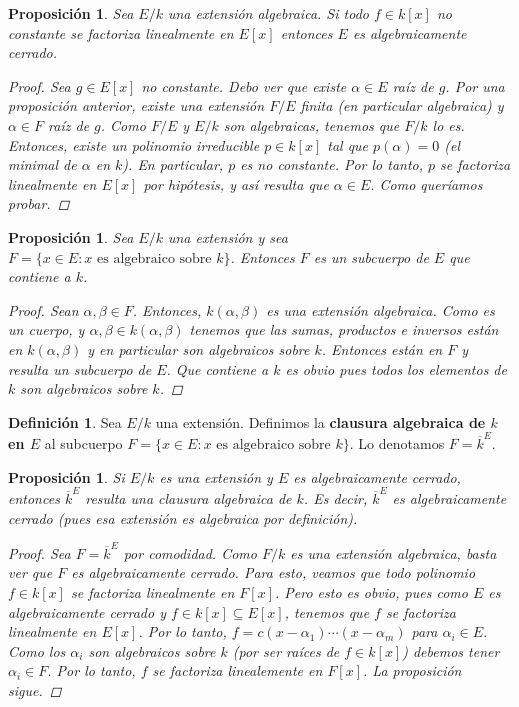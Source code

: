 \documentclass[12pt]{book}
\newtheorem{prop}[teo]{Proposición}
\theoremstyle{definition}
\newtheorem{defn}[teo]{Definición}
\begin{document}
\begin{prop}
Sea $E/k$ una extensión algebraica. Si todo $f\in k[x]$ no constante se factoriza linealmente en $E[x]$ entonces $E$ es algebraicamente cerrado.
\begin{proof}
Sea $g\in E[x]$ no constante. Debo ver que existe $\alpha\in E$ raíz de $g$. Por una proposición anterior, existe una extensión $F/E$ finita (en particular algebraica) y $\alpha\in F$ raíz de $g$. Como $F/E$ y $E/k$ son algebraicas, tenemos que $F/k$ lo es. Entonces, existe un polinomio irreducible $p\in k[x]$ tal que $p(\alpha)=0$ (el minimal de $\alpha$ en $k$). En particular, $p$ es no constante. Por lo tanto, $p$ se factoriza linealmente en $E[x]$ por hipótesis, y así resulta que $\alpha\in E$. Como queríamos probar.
\end{proof}
\end{prop}

\begin{prop}
Sea $E/k$ una extensión y sea $F=\{x\in E : x \text{ es algebraico sobre }k\}$. Entonces $F$ es un subcuerpo de $E$ que contiene a $k$.
\begin{proof}
Sean $\alpha,\beta\in F$. Entonces, $k(\alpha,\beta)$ es una extensión algebraica. Como es un cuerpo, y $\alpha,\beta\in k(\alpha,\beta)$ tenemos que las sumas, productos e inversos están en $k(\alpha,\beta)$ y en particular son algebraicos sobre $k$. Entonces están en $F$ y resulta un subcuerpo de $E$. Que contiene a $k$ es obvio pues todos los elementos de $k$ son algebraicos sobre $k$.
\end{proof}
\end{prop}

\begin{defn}
Sea $E/k$ una extensión. Definimos la \textbf{clausura algebraica de $k$ en $E$} al subcuerpo $F=\{x\in E : x\text{ es algebraico sobre }k\}$. Lo denotamos $F=\overline{k}^E$.
\end{defn}

\begin{prop}
Si $E/k$ es una extensión y $E$ es algebraicamente cerrado, entonces $\overline{k}^E$ resulta una clausura algebraica de $k$. Es decir, $\overline{k}^E$ es algebraicamente cerrado (pues esa extensión es algebraica por definición).
\begin{proof}
Sea $F=\overline{k}^E$ por comodidad. Como $F/k$ es una extensión algebraica, basta ver que $F$ es algebraicamente cerrado. Para esto, veamos que todo polinomio $f\in k[x]$ se factoriza linealmente en $F[x]$. Pero esto es obvio, pues como $E$ es algebraicamente cerrado y $f\in k[x]\subseteq E[x]$, tenemos que $f$ se factoriza linealmente en $E[x]$. Por lo tanto, $f = c(x-\alpha_1)\cdots (x-\alpha_m)$ para $\alpha_i\in E$. Como los $\alpha_i$ son algebraicos sobre $k$ (por ser raíces de $f\in k[x]$) debemos tener $\alpha_i\in F$. Por lo tanto, $f$ se factoriza linealemente en $F[x]$. La proposición sigue.
\end{proof}
\end{prop}
\end{document}
